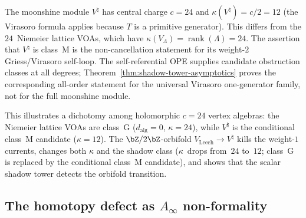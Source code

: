 \begin{remark}%
\label{rem:vnatural-class-m}%
\ClaimStatusProvedHere%
%
%
The moonshine module $V^\natural$ has central charge $c = 24$
and $\kappa(V^\natural) = c/2 = 12$
\textup{(}the Virasoro formula applies because $T$ is a
primitive generator\textup{)}. This differs from the
$24$~Niemeier lattice VOAs, which have
$\kappa(V_\Lambda) = \operatorname{rank}(\Lambda) = 24$. The assertion
that $V^\natural$ is class~M is the non-cancellation statement for its
weight-$2$ Griess/Virasoro self-loop. The self-referential OPE supplies
candidate obstruction classes at all degrees; Theorem~\ref{thm:shadow-tower-asymptotics}
proves the corresponding all-order statement for the universal
Virasoro one-generator family, not for the full moonshine module.

This illustrates a dichotomy among holomorphic $c = 24$
vertex algebras: the Niemeier lattice VOAs are class~G
($d_{\mathrm{alg}} = 0$, $\kappa = 24$), while
$V^\natural$ is the conditional class~M candidate
($\kappa = 12$). The $\bZ/2\bZ$-orbifold
$V_{\mathrm{Leech}} \to V^\natural$ kills the weight-$1$
currents, changes both $\kappa$ and the shadow class
\textup{(}$\kappa$~drops from~$24$ to~$12$; class~G
is replaced by the conditional class~M candidate\textup{)}, and shows
that the scalar shadow tower detects the orbifold transition.
\end{remark}

\subsection{The homotopy defect as $A_\infty$ non-formality}
\label{sec:vvmf-rankin-selberg}

